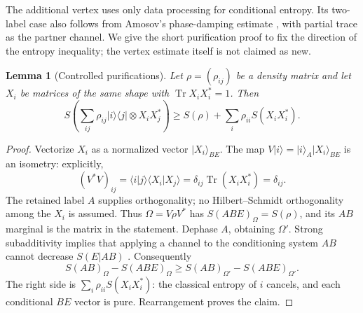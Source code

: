 \documentclass[11pt]{article}
\newtheorem{lemma}[theorem]{Lemma}
\newcommand{\Tr}{\operatorname{Tr}}
\begin{document}
The additional vertex uses only data processing for conditional entropy. Its two-label case also follows from Amosov's phase-damping estimate \cite[Proposition 5]{amosov}, with partial trace as the partner channel. We give the short purification proof to fix the direction of the entropy inequality; the vertex estimate itself is not claimed as new.
\begin{lemma}[Controlled purifications]\label{lem:controlled}
Let $\rho=(\rho_{ij})$ be a density matrix and let $X_i$ be matrices of the same shape with $\Tr X_iX_i^*=1$. Then
\[
 S\left(\sum_{ij}\rho_{ij}|i\rangle\langle j|\otimes X_iX_j^*\right)
 \ge S(\rho)+\sum_i\rho_{ii}S(X_iX_i^*).
\]
\end{lemma}
\begin{proof}
Vectorize $X_i$ as a normalized vector $|X_i\rangle_{BE}$. The map
$V|i\rangle=|i\rangle_A|X_i\rangle_{BE}$ is an isometry: explicitly,
\[
 (V^*V)_{ij}=\langle i|j\rangle\langle X_i|X_j\rangle
 =\delta_{ij}\Tr(X_iX_i^*)=\delta_{ij}.
\]
The retained label $A$ supplies orthogonality; no Hilbert--Schmidt
orthogonality among the $X_i$ is assumed. Thus
$\Omega=V\rho V^*$ has $S(ABE)_\Omega=S(\rho)$, and its $AB$ marginal is the matrix in the statement. Dephase $A$, obtaining $\Omega'$. Strong subadditivity implies that applying a channel to the conditioning system $AB$ cannot decrease $S(E|AB)$ \cite{ssa}. Consequently
\[
 S(AB)_\Omega-S(ABE)_\Omega
 \ge S(AB)_{\Omega'}-S(ABE)_{\Omega'}.
\]
The right side is $\sum_i\rho_{ii}S(X_iX_i^*)$: the classical entropy of $i$ cancels, and each conditional $BE$ vector is pure. Rearrangement proves the claim.
\end{proof}
\end{document}
